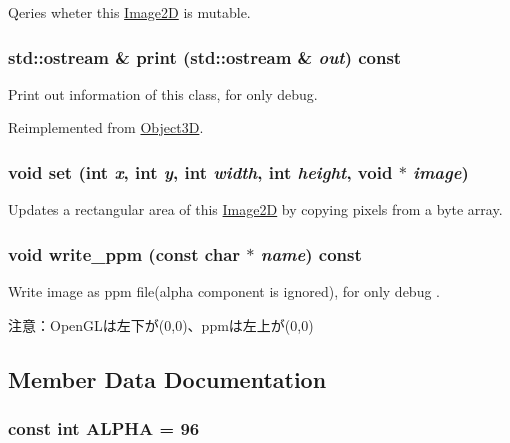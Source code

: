 Qeries wheter this \hyperlink{classm3g_1_1Image2D}{Image2D} is mutable. \hypertarget{classm3g_1_1Image2D_6fea17fa1532df3794f8cb39cb4f911f}{
\subsubsection[{print}]{\setlength{\rightskip}{0pt plus 5cm}std::ostream \& print (std::ostream \& {\em out}) const}}
\label{classm3g_1_1Image2D_6fea17fa1532df3794f8cb39cb4f911f}


Print out information of this class, for only debug. 

Reimplemented from \hyperlink{classm3g_1_1Object3D_6fea17fa1532df3794f8cb39cb4f911f}{Object3D}.\hypertarget{classm3g_1_1Image2D_fe9ef1abefb9e92b38687e27c9004bdc}{
\subsubsection[{set}]{\setlength{\rightskip}{0pt plus 5cm}void set (int {\em x}, \/  int {\em y}, \/  int {\em width}, \/  int {\em height}, \/  void $\ast$ {\em image})}}
\label{classm3g_1_1Image2D_fe9ef1abefb9e92b38687e27c9004bdc}


Updates a rectangular area of this \hyperlink{classm3g_1_1Image2D}{Image2D} by copying pixels from a byte array. \hypertarget{classm3g_1_1Image2D_32ee5b2bcc9c7bf69b925413eeccb4bf}{
\subsubsection[{write\_\-ppm}]{\setlength{\rightskip}{0pt plus 5cm}void write\_\-ppm (const char $\ast$ {\em name}) const}}
\label{classm3g_1_1Image2D_32ee5b2bcc9c7bf69b925413eeccb4bf}


Write image as ppm file(alpha component is ignored), for only debug .

注意：OpenGLは左下が(0,0)、ppmは左上が(0,0) 

\subsection{Member Data Documentation}
\hypertarget{classm3g_1_1Image2D_417581fcde4067111f47320edb2aa378}{
\subsubsection[{ALPHA}]{\setlength{\rightskip}{0pt plus 5cm}const int {\bf ALPHA} = 96}}
\label{classm3g_1_1Image2D_417581fcde4067111f47320edb2aa378}


